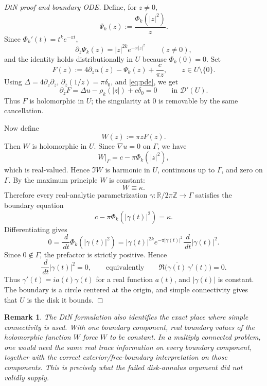 \documentclass[11pt]{article}
\newtheorem{remark}[theorem]{Remark}
\newcommand{\R}{\mathbb R}
\newcommand{\Z}{\mathbb Z}
\newcommand{\1}{\mathbf 1}
\newcommand{\dd}{\,d}
\newcommand{\pbar}{\partial_{\bar z}}
\newcommand{\pz}{\partial_z}
\begin{document}
\begin{proof}[DtN proof and boundary ODE]
Define, for \(z\neq0\),
\[
  \Psi_k(z):=\frac{\Phi_k(|z|^2)}{z}.
\]
Since \(\Phi_k'(t)=t^k e^{-\pi t}\),
\[
  \pbar\Psi_k(z)=|z|^{2k}e^{-\pi |z|^2}
  \qquad(z\neq0),
\]
and the identity holds distributionally in \(U\) because \(\Phi_k(0)=0\).  Set
\[
  F(z):=4\pz u(z)-\Psi_k(z)+\frac{c}{\pi z},
  \qquad z\in U\setminus\{0\}.
\]
Using \(\Delta=4\pz\pbar\), \(\pbar(1/z)=\pi\delta_0\), and \eqref{eq:pde}, we get
\[
  \pbar F
  =
  \Delta u-\rho_k(|z|)+c\delta_0
  =0
  \qquad\text{in }\mathcal D'(U).
\]
Thus \(F\) is holomorphic in \(U\); the singularity at \(0\) is removable by the
same cancellation.

Now define
\[
  W(z):=\pi zF(z).
\]
Then \(W\) is holomorphic in \(U\).  Since \(\nabla u=0\) on \(\Gamma\), we have
\[
  W|_\Gamma
  =
  c-\pi\Phi_k(|z|^2),
\]
which is real-valued.  Hence \(\Im W\) is harmonic in \(U\), continuous up to
\(\Gamma\), and zero on \(\Gamma\).  By the maximum principle \(W\) is constant:
\[
  W\equiv\kappa .
\]
Therefore every real-analytic parametrization \(\gamma:\R/2\pi\Z\to\Gamma\)
satisfies the boundary equation
\begin{equation}\label{eq:param-equation}
  c-\pi\Phi_k(|\gamma(t)|^2)=\kappa .
\end{equation}
Differentiating gives
\[
  0
  =
  \frac{\dd}{\dd t}\Phi_k(|\gamma(t)|^2)
  =
  |\gamma(t)|^{2k}e^{-\pi|\gamma(t)|^2}
  \frac{\dd}{\dd t}|\gamma(t)|^2 .
\]
Since \(0\notin\Gamma\), the prefactor is strictly positive.  Hence
\begin{equation}\label{eq:param-ode}
  \frac{\dd}{\dd t}|\gamma(t)|^2=0,
  \qquad\text{equivalently}\qquad
  \Re\bigl(\overline{\gamma(t)}\,\gamma'(t)\bigr)=0.
\end{equation}
Thus \(\gamma'(t)=i a(t)\gamma(t)\) for a real function \(a(t)\), and
\(|\gamma(t)|\) is constant.  The boundary is a circle centered at the origin,
and simple connectivity gives that \(U\) is the disk it bounds.
\end{proof}

\begin{remark}
The DtN formulation also identifies the exact place where simple connectivity is
used.  With one boundary component, real boundary values of the holomorphic
function \(W\) force \(W\) to be constant.  In a multiply connected problem, one
would need the same real trace information on every boundary component, together
with the correct exterior/free-boundary interpretation on those components.  This
is precisely what the failed disk-annulus argument did not validly supply.
\end{remark}
\end{document}
